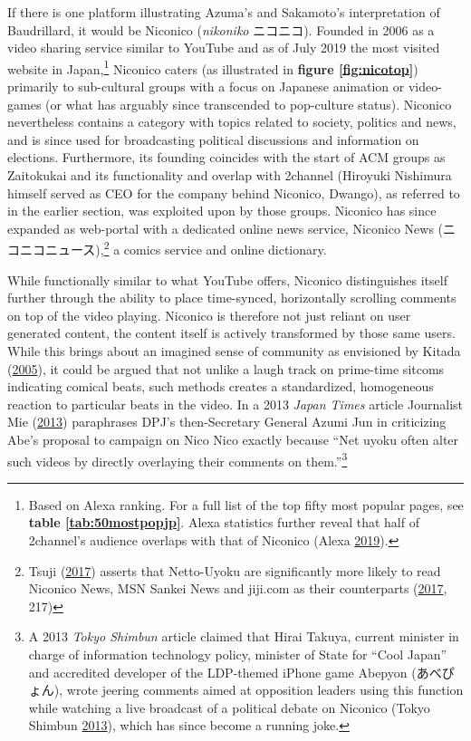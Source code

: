 \documentclass[10pt,british,A4paper,,openany]{memoir}
\begin{document}
If there is one platform illustrating Azuma's and Sakamoto's
interpretation of Baudrillard, it would be Niconico (\emph{nikoniko}
ニコニコ). Founded in 2006 as a video sharing service similar to YouTube
and as of July 2019 the  most visited website in
Japan,\footnote{Based on Alexa ranking. For a full list of the top fifty
  most popular pages, see \textbf{table \ref{tab:50mostpopjp}}. Alexa
  statistics further reveal that half of 2channel's audience overlaps
  with that of Niconico (Alexa
  \protect\hyperlink{ref-alexa_alexa_2019}{2019}).} Niconico caters (as
illustrated in \textbf{figure \ref{fig:nicotop}}) primarily to
sub-cultural groups with a focus on Japanese animation or video-games
(or what has arguably since transcended to pop-culture status). Niconico
nevertheless contains a category with topics related to society,
politics and news, and is since used for broadcasting political
discussions and information on elections. Furthermore, its founding
coincides with the start of ACM groups as Zaitokukai and its
functionality and overlap with 2channel (Hiroyuki Nishimura himself
served as CEO for the company behind Niconico, Dwango), as referred to
in the earlier section, was exploited upon by those groups. Niconico has
since expanded as web-portal with a dedicated online news service,
Niconico News (ニコニコニュース),\footnote{Tsuji
  (\protect\hyperlink{ref-tsuji_eng._2017}{2017}) asserts that
  Netto-Uyoku are significantly more likely to read Niconico News, MSN
  Sankei News and jiji.com as their counterparts
  (\protect\hyperlink{ref-tsuji_eng._2017}{2017}, 217)} a comics service
and online dictionary.

While functionally similar to what YouTube offers, Niconico
distinguishes itself further through the ability to place time-synced,
horizontally scrolling comments on top of the video playing. Niconico is
therefore not just reliant on user generated content, the content itself
is actively transformed by those same users. While this brings about an
imagined sense of community as envisioned by Kitada
(\protect\hyperlink{ref-kitada_eng:_2005}{2005}), it could be argued
that not unlike a laugh track on prime-time sitcoms indicating comical
beats, such methods creates a standardized, homogeneous reaction to
particular beats in the video. In a 2013 \emph{Japan Times} article
Journalist Mie (\protect\hyperlink{ref-mie_xenophobia_2013}{2013})
paraphrases DPJ's then-Secretary General Azumi Jun in criticizing Abe's
proposal to campaign on Nico Nico exactly because ``Net uyoku often
alter such videos by directly overlaying their comments on
them.''\footnote{A 2013 \emph{Tokyo Shimbun} article claimed that Hirai
  Takuya, current minister in charge of information technology policy,
  minister of State for ``Cool Japan'' and accredited developer of the
  LDP-themed iPhone game Abepyon (あべぴょん), wrote jeering comments
  aimed at opposition leaders using this function while watching a live
  broadcast of a political debate on Niconico (Tokyo Shimbun
  \protect\hyperlink{ref-tokyo_shimbun_tokyo_2013}{2013}), which has
  since become a running joke.}
\end{document}
